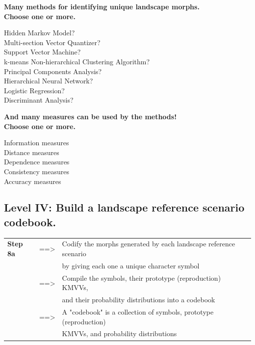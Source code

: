 \documentclass[
paper=128mm:96mm, %
fontsize=11pt, %
pagesize, %
parskip=half-, %
]{scrartcl} %
\theoremstyle{mythmstyle} %
\begin{document}
\clearpage
\textbf{\normalsize Many methods for identifying unique landscape morphs.\\
Choose one or more.}
\begin{flushleft}
Hidden Markov Model?\\
Multi-section Vector Quantizer?\\
Support Vector Machine?\\
k-means Non-hierarchical Clustering Algorithm?\\
Principal Components Analysis?\\
Hierarchical Neural Network?\\
Logistic Regression?\\
Discriminant Analysis?
\end{flushleft}

\clearpage
\textbf{\normalsize And many measures can be used by the methods!\\
Choose one or more.}
\begin{flushleft}
Information measures\\ 
Distance measures\\
Dependence measures\\
Consistency measures\\
Accuracy measures
\end{flushleft}

\clearpage
\subsection{Level IV: Build a landscape reference scenario codebook.}
\footnotesize 
\begin{tabular}{lll}
	\textbf{Step 8a} & ==> & Codify the morphs generated by each landscape reference scenario \\
	& & by giving each one a unique character symbol\\
	& ==> & Compile the symbols, their prototype (reproduction) KMVVs,  \\
	& & and their probability distributions into a codebook\\
	& ==> & A "codebook" is a collection of symbols, prototype (reproduction)\\
	& &  KMVVs, and probability distributions
	
\end{tabular}
\end{document}
